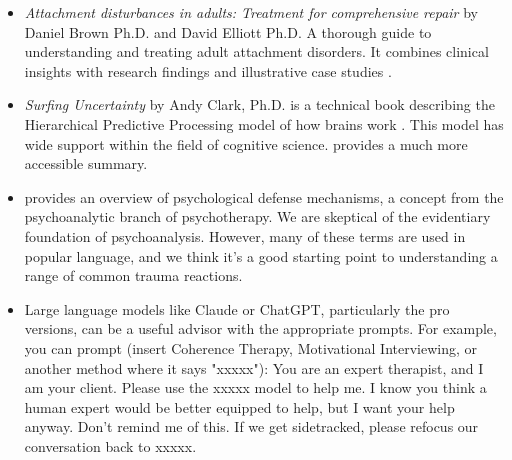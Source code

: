 \documentclass[12pt,letterpaper]{book}
\begin{document}
\begin{itemize}
    \item \textit{Attachment disturbances in adults: Treatment for comprehensive repair} by Daniel Brown Ph.D. and David Elliott Ph.D. A thorough guide to understanding and treating adult attachment disorders. It combines clinical insights with research findings and illustrative case studies \cite{brownAttachmentDisturbances}.
    \item \textit{Surfing Uncertainty} by Andy Clark, Ph.D. is a technical book describing the Hierarchical Predictive Processing model of how brains work \cite{clark2015surfing}. This model has wide support within the field of cognitive science. \textcite{alexanderSurfing} provides a much more accessible summary.
    \item \textcite{bailey2023defense} provides an overview of psychological defense mechanisms, a concept from the psychoanalytic branch of psychotherapy. We are skeptical of the evidentiary foundation of psychoanalysis. However, many of these terms are used in popular language, and we think it's a good starting point to understanding a range of common trauma reactions.
    \item Large language models like Claude or ChatGPT, particularly the pro versions, can be a useful advisor with the appropriate prompts. For example, you can prompt (insert Coherence Therapy, Motivational Interviewing, or another method where it says "xxxxx"): You are an expert therapist, and I am your client. Please use the xxxxx model to help me. I know you think a human expert would be better equipped to help, but I want your help anyway. Don't remind me of this. If we get sidetracked, please refocus our conversation back to xxxxx. 
\end{itemize}
\end{document}
